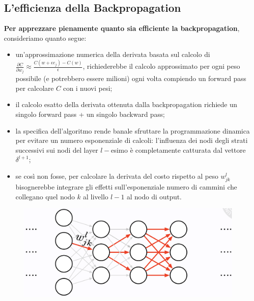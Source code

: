 \subsection{L'efficienza della Backpropagation}
\textbf{Per apprezzare pienamente quanto sia efficiente la backpropagation}, consideriamo quanto segue:
\begin{itemize}
    \item un'approssimazione numerica della derivata basata sul calcolo di $\frac{\partial C}{\partial w_{j}}\approx \frac{C(w+\epsilon e_j)-C(w)}{\epsilon}$, richiederebbe il calcolo approssimato per ogni peso possibile (e potrebbero essere milioni) ogni volta compiendo un forward pass per calcolare $C$ con i nuovi pesi;
    \item il calcolo esatto della derivata ottenuta dalla backpropagation richiede un singolo forward pass + un singolo backward pass;
    \item la specifica dell'algoritmo rende banale sfruttare la programmazione dinamica per evitare un numero esponenziale di calcoli: l'influenza dei nodi degli strati successivi sui nodi del layer $l-$esimo è completamente catturata dal vettore $\delta^{l+1}$;
    \item se così non fosse, per calcolare la derivata del costo rispetto al peso $w^l_{jk}$ bisognerebbe integrare gli effetti sull'esponenziale numero di cammini che collegano quel nodo $k$ al livello $l-1$ al nodo di output. 
\end{itemize}
\begin{figure}[!h]
    \includegraphics[scale=.44]{images/backpropagation/efficiency.png}
    \centering
\end{figure}
\newpage